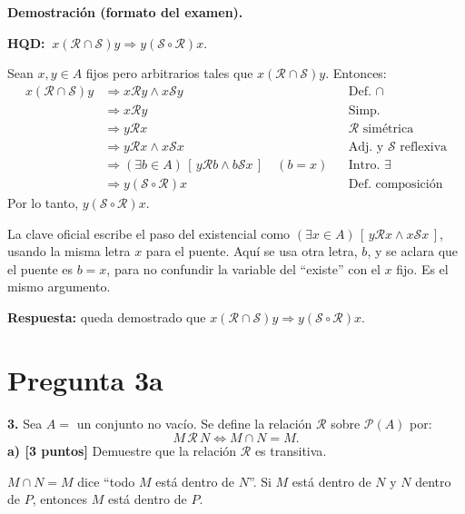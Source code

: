 \documentclass[11pt]{article}
\newcommand{\R}{\mathcal{R}}
\newcommand{\Sr}{\mathcal{S}}
\newcommand{\hl}[1]{\colorbox{green!35}{#1}}
\begin{document}
\textbf{Demostración (formato del examen).}

\textbf{HQD:} $\ x(\R\cap\Sr)y\Rightarrow y(\Sr\circ\R)x$.

Sean $x,y\in A$ fijos pero arbitrarios tales que $x(\R\cap\Sr)y$. Entonces:
\begin{align*}
x(\R\cap\Sr)y &\Rightarrow x\R y\wedge x\Sr y && \text{Def. }\cap\\
&\Rightarrow x\R y && \text{Simp.}\\
&\Rightarrow y\R x && \R\text{ simétrica}\\
&\Rightarrow y\R x\wedge x\Sr x && \text{Adj. y }\Sr\text{ reflexiva}\\
&\Rightarrow (\exists b\in A)\,[\,y\R b\wedge b\Sr x\,]\quad(b=x) && \text{Intro. }\exists\\
&\Rightarrow y(\Sr\circ\R)x && \text{Def. composición}
\end{align*}
Por lo tanto, $y(\Sr\circ\R)x$.

\begin{nota}
La clave oficial escribe el paso del existencial como $(\exists x\in A)\,[\,y\R x\wedge x\Sr x\,]$, usando la misma letra $x$ para el puente. Aquí se usa otra letra, $b$, y se aclara que el puente es $b=x$, para no confundir la variable del ``existe'' con el $x$ fijo. Es el mismo argumento.
\end{nota}

\textbf{Respuesta:} queda demostrado que $x(\R\cap\Sr)y\Rightarrow y(\Sr\circ\R)x$.

\clearpage
\section*{Pregunta 3a}

\textbf{3.} Sea $A=$ un conjunto no vacío. Se define la relación $\R$ sobre $\mathcal P(A)$ por:
\[
M\,\R\,N\iff M\cap N=M.
\]
\textbf{a) [3 puntos]} Demuestre que la relación $\R$ es \hl{transitiva}.

\begin{center}

{\small $M\cap N=M$ dice ``todo $M$ está dentro de $N$''. Si $M$ está dentro de $N$ y $N$ dentro de $P$, entonces $M$ está dentro de $P$.}
\end{center}
\end{document}
